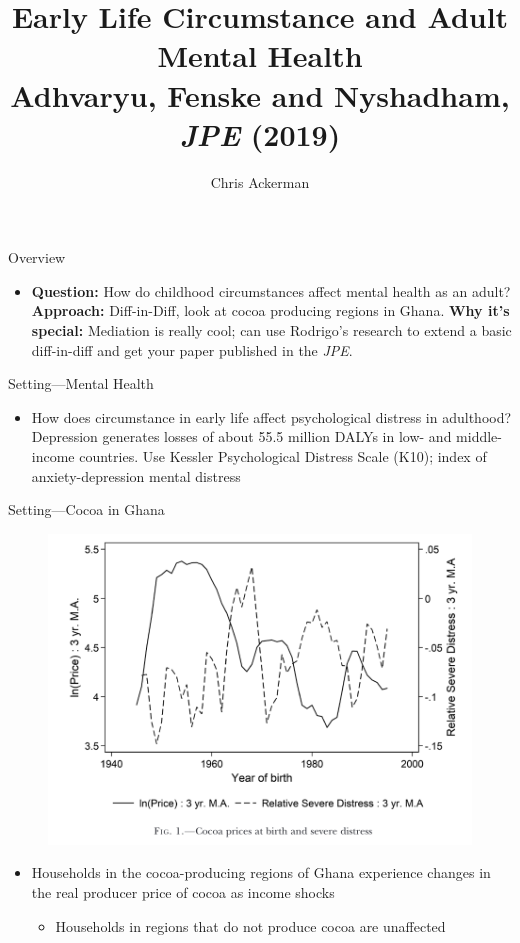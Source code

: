 \documentclass[dvipsnames]{beamer}
\title{Early Life Circumstance and Adult Mental Health\\Adhvaryu, Fenske and Nyshadham, \emph{JPE} (2019)}
\author{Chris Ackerman}
\begin{document}
\maketitle

\begin{frame}{Overview}
  \begin{itemize}
  \item \textbf{Question:} How do childhood circumstances affect mental health as an adult?
    \vitem \textbf{Approach:} Diff-in-Diff, look at cocoa producing regions in Ghana.
    \vitem \textbf{Why it's special:} Mediation is really cool; can use Rodrigo's research to extend a basic diff-in-diff and get your paper published in the \emph{JPE}.
  \end{itemize}
\end{frame}
%
\begin{frame}{Setting---Mental Health}
  \begin{itemize}
  \item How does circumstance in early life affect psychological distress in adulthood?
    \vitem Depression generates losses of about 55.5 million DALYs in low- and middle-income countries.
    \vitem Use Kessler Psychological Distress Scale (K10); index of anxiety-depression mental distress
  \end{itemize}
\end{frame}
%
\begin{frame}{Setting---Cocoa in Ghana}
    \begin{figure}[htp]
      \centering
      \includegraphics[width=.7\textwidth, keepaspectratio=true]{fig1.png}
    \end{figure}
  \begin{itemize}
  \item Households in the cocoa-producing regions of Ghana experience changes in the real producer price of cocoa as income shocks
    \begin{itemize}
    \item Households in regions that do not produce cocoa are unaffected
    \end{itemize}
  \end{itemize}
\end{frame}
\end{document}
